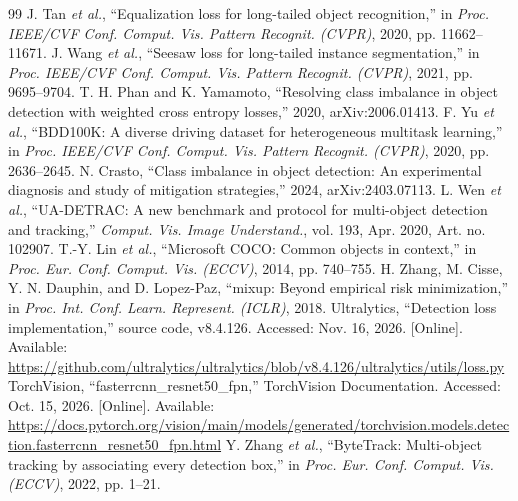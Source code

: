 \documentclass[10pt,journal,a4paper]{IEEEtran}
\begin{document}
\begin{thebibliography}{99}
 J. Tan \textit{et al.}, ``Equalization loss for long-tailed object recognition,'' in \textit{Proc. IEEE/CVF Conf. Comput. Vis. Pattern Recognit. (CVPR)}, 2020, pp. 11662--11671.
 J. Wang \textit{et al.}, ``Seesaw loss for long-tailed instance segmentation,'' in \textit{Proc. IEEE/CVF Conf. Comput. Vis. Pattern Recognit. (CVPR)}, 2021, pp. 9695--9704.
 T. H. Phan and K. Yamamoto, ``Resolving class imbalance in object detection with weighted cross entropy losses,'' 2020, arXiv:2006.01413.
 F. Yu \textit{et al.}, ``BDD100K: A diverse driving dataset for heterogeneous multitask learning,'' in \textit{Proc. IEEE/CVF Conf. Comput. Vis. Pattern Recognit. (CVPR)}, 2020, pp. 2636--2645.
 N. Crasto, ``Class imbalance in object detection: An experimental diagnosis and study of mitigation strategies,'' 2024, arXiv:2403.07113.
 L. Wen \textit{et al.}, ``UA-DETRAC: A new benchmark and protocol for multi-object detection and tracking,'' \textit{Comput. Vis. Image Understand.}, vol. 193, Apr. 2020, Art. no. 102907.
 T.-Y. Lin \textit{et al.}, ``Microsoft COCO: Common objects in context,'' in \textit{Proc. Eur. Conf. Comput. Vis. (ECCV)}, 2014, pp. 740--755.
 H. Zhang, M. Cisse, Y. N. Dauphin, and D. Lopez-Paz, ``mixup: Beyond empirical risk minimization,'' in \textit{Proc. Int. Conf. Learn. Represent. (ICLR)}, 2018.
 Ultralytics, ``Detection loss implementation,'' source code, v8.4.126. Accessed: Nov. 16, 2026. [Online]. Available: \url{https://github.com/ultralytics/ultralytics/blob/v8.4.126/ultralytics/utils/loss.py}
 TorchVision, ``fasterrcnn\_resnet50\_fpn,'' TorchVision Documentation. Accessed: Oct. 15, 2026. [Online]. Available: \url{https://docs.pytorch.org/vision/main/models/generated/torchvision.models.detection.fasterrcnn_resnet50_fpn.html}
 Y. Zhang \textit{et al.}, ``ByteTrack: Multi-object tracking by associating every detection box,'' in \textit{Proc. Eur. Conf. Comput. Vis. (ECCV)}, 2022, pp. 1--21.
\end{thebibliography}
\end{document}
